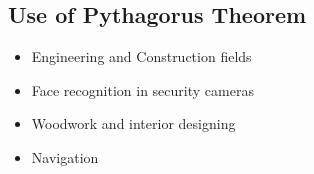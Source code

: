 \documentclass{article}
\begin{document}
\subsection*{Use of Pythagorus Theorem}

\begin{itemize}
        \item Engineering and Construction fields
        \item Face recognition in security cameras
        \item Woodwork and interior designing
        \item Navigation
\end{itemize}
\end{document}

